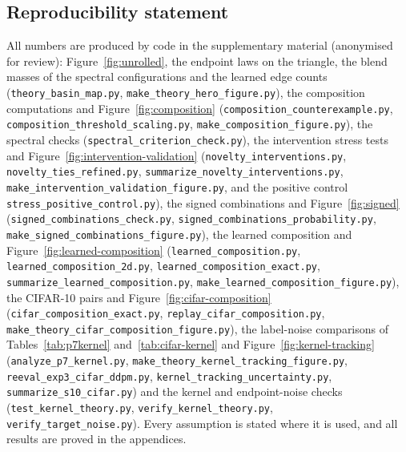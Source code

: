 \documentclass{article} %
\theoremstyle{plain}
\theoremstyle{definition}
\theoremstyle{remark}
\newif\ifproofpointer \proofpointertrue
\begin{document}
\subsection*{Reproducibility statement}
\begingroup\raggedright
All numbers are produced by code in the supplementary material (anonymised for review):
Figure~\ref{fig:unrolled}, the endpoint laws on the triangle, the blend masses of the spectral
configurations and the learned edge counts (\texttt{theory\_basin\_map.py},
\texttt{make\_theory\_hero\_figure.py}), the composition computations and
Figure~\ref{fig:composition} (\texttt{composition\_counterexample.py},
\texttt{composition\_threshold\_scaling.py}, \texttt{make\_composition\_figure.py}), the spectral
checks (\texttt{spectral\_criterion\_check.py}),
the intervention stress tests and Figure~\ref{fig:intervention-validation}
(\texttt{novelty\_interventions.py}, \texttt{novelty\_ties\_refined.py},
\texttt{summarize\_novelty\_interventions.py}, \texttt{make\_intervention\_validation\_figure.py},
and the positive control \texttt{stress\_positive\_control.py}), the signed combinations and
Figure~\ref{fig:signed} (\texttt{signed\_combinations\_check.py},
\texttt{signed\_combinations\_probability.py}, \texttt{make\_signed\_combinations\_figure.py}), the
learned composition and Figure~\ref{fig:learned-composition} (\texttt{learned\_composition.py},
\texttt{learned\_composition\_2d.py}, \texttt{learned\_composition\_exact.py},
\texttt{summarize\_learned\_composition.py}, \texttt{make\_learned\_composition\_figure.py}), the
CIFAR-10 pairs and
Figure~\ref{fig:cifar-composition} (\texttt{cifar\_composition\_exact.py},
\texttt{replay\_cifar\_composition.py},
\texttt{make\_theory\_cifar\_composition\_figure.py}), the label-noise comparisons of
Tables~\ref{tab:p7kernel} and~\ref{tab:cifar-kernel} and Figure~\ref{fig:kernel-tracking}
(\texttt{analyze\_p7\_kernel.py}, \texttt{make\_theory\_kernel\_tracking\_figure.py},
\texttt{reeval\_exp3\_cifar\_ddpm.py}, \texttt{kernel\_tracking\_uncertainty.py},
\texttt{summarize\_s10\_cifar.py}) and the kernel and endpoint-noise checks
(\texttt{test\_kernel\_theory.py}, \texttt{verify\_kernel\_theory.py},
\texttt{verify\_target\_noise.py}). Every assumption is stated where it is used, and all results are
proved in the appendices.\par\endgroup




\appendix
\proofpointerfalse
\end{document}
